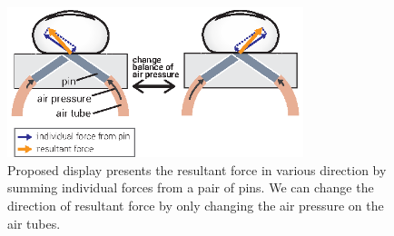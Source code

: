 


\begin{figure}[t]
  \centering
  \includegraphics[width=3.4in]{images/fig_intro.eps}
  \caption{Proposed display presents the resultant force in various direction by summing individual forces from a pair of pins. We can change the direction of resultant force by only changing the air pressure on the air tubes.}
  \label{fig_intro}
\end{figure}

